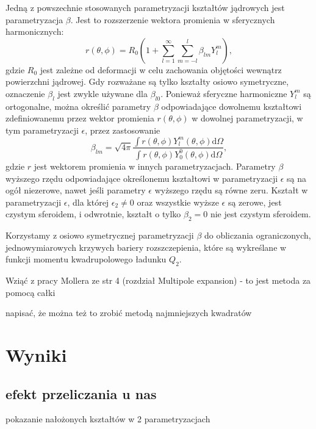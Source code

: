 \documentclass[polish]{article}
\numberwithin{equation}{section}
\begin{document}
Jedną z powszechnie stosowanych parametryzacji kształtów jądrowych jest parametryzacja $\beta$. Jest to rozszerzenie wektora promienia w sferycznych harmonicznych:
\begin{equation}
r(\theta,\phi)=R_{0}\left(1+\sum_{l=1}^{\infty}\sum_{m=-l}^{l}\beta_{lm}Y^{m}_{l}\right),
\end{equation}
gdzie $R_{0}$ jest zależne od deformacji w celu zachowania objętości wewnątrz powierzchni jądrowej. Gdy rozważane są tylko kształty osiowo symetryczne, oznaczenie $\beta_{l}$ jest zwykle używane dla $\beta_{l0}$. Ponieważ sferyczne harmoniczne $Y^{m}_{l}$ są ortogonalne, można określić parametry $\beta$ odpowiadające dowolnemu kształtowi zdefiniowanemu przez wektor promienia $r(\theta,\phi)$ w dowolnej parametryzacji, w tym parametryzacji $\epsilon$, przez zastosowanie
\begin{equation}
\beta_{lm}=\sqrt{4\pi}\frac{\int r(\theta,\phi)Y^{m}_{l}(\theta,\phi)\mathrm{d}\Omega}{\int r(\theta,\phi)Y^{0}_{0}(\theta,\phi)\mathrm{d}\Omega},
\end{equation}
gdzie $r$ jest wektorem promienia w innych parametryzacjach. Parametry $\beta$ wyższego rzędu odpowiadające określonemu kształtowi w parametryzacji $\epsilon$ są na ogół niezerowe, nawet jeśli parametry $\epsilon$ wyższego rzędu są równe zeru. Kształt w parametryzacji $\epsilon$, dla której $\epsilon_{2}\neq0$ oraz wszystkie wyższe $\epsilon$ są zerowe, jest czystym sferoidem, i odwrotnie, kształt o tylko $\beta_{2}=0$ nie jest czystym sferoidem.

Korzystamy z osiowo symetrycznej parametryzacji $\beta$ do obliczania ograniczonych, jednowymiarowych krzywych bariery rozszczepienia, które są wykreślane w funkcji momentu kwadrupolowego ładunku $Q_{2}$.


\bigskip
Wziąć z pracy Mollera ze str 4 (rozdział Multipole expansion) - to jest metoda za pomocą całki

napisać, że można też to zrobić metodą najmniejszych kwadratów

\section{Wyniki}

\subsection{efekt przeliczania u nas}

pokazanie nałożonych kształtów w 2 parametryzacjach
\end{document}
